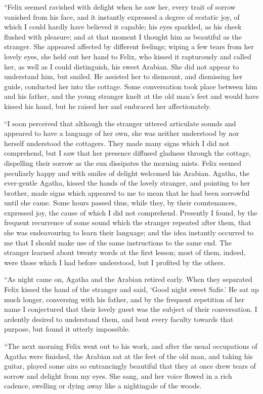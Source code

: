 \documentclass[12pt,openright]{book}
\begin{document}
“Felix seemed ravished with delight when he saw her, every trait of sorrow vanished from his face, and it instantly expressed a degree of ecstatic joy, of which I could hardly have believed it capable; his eyes sparkled, as his cheek flushed with pleasure; and at that moment I thought him as beautiful as the stranger. She appeared affected by different feelings; wiping a few tears from her lovely eyes, she held out her hand to Felix, who kissed it rapturously and called her, as well as I could distinguish, his sweet Arabian. She did not appear to understand him, but smiled. He assisted her to dismount, and dismissing her guide, conducted her into the cottage. Some conversation took place between him and his father, and the young stranger knelt at the old man’s feet and would have kissed his hand, but he raised her and embraced her affectionately.

“I soon perceived that although the stranger uttered articulate sounds and appeared to have a language of her own, she was neither understood by nor herself understood the cottagers. They made many signs which I did not comprehend, but I saw that her presence diffused gladness through the cottage, dispelling their sorrow as the sun dissipates the morning mists. Felix seemed peculiarly happy and with smiles of delight welcomed his Arabian. Agatha, the ever-gentle Agatha, kissed the hands of the lovely stranger, and pointing to her brother, made signs which appeared to me to mean that he had been sorrowful until she came. Some hours passed thus, while they, by their countenances, expressed joy, the cause of which I did not comprehend. Presently I found, by the frequent recurrence of some sound which the stranger repeated after them, that she was endeavouring to learn their language; and the idea instantly occurred to me that I should make use of the same instructions to the same end. The stranger learned about twenty words at the first lesson; most of them, indeed, were those which I had before understood, but I profited by the others.

“As night came on, Agatha and the Arabian retired early. When they separated Felix kissed the hand of the stranger and said, ‘Good night sweet Safie.’ He sat up much longer, conversing with his father, and by the frequent repetition of her name I conjectured that their lovely guest was the subject of their conversation. I ardently desired to understand them, and bent every faculty towards that purpose, but found it utterly impossible.

“The next morning Felix went out to his work, and after the usual occupations of Agatha were finished, the Arabian sat at the feet of the old man, and taking his guitar, played some airs so entrancingly beautiful that they at once drew tears of sorrow and delight from my eyes. She sang, and her voice flowed in a rich cadence, swelling or dying away like a nightingale of the woods.
\end{document}
